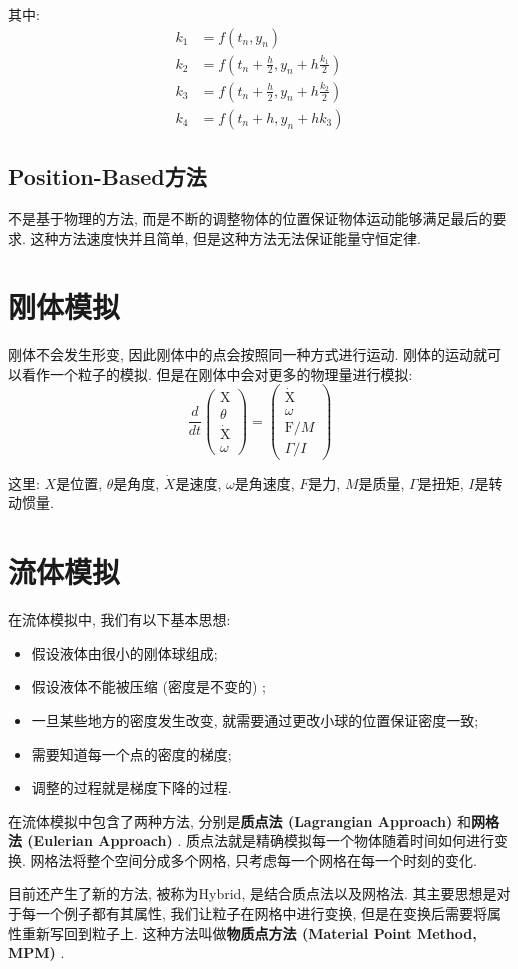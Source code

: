 \documentclass[openany]{progbookcn}
\begin{document}
其中: 
\begin{equation}
	\begin{split}
		k_{1} &=f\left(t_{n}, y_{n}\right) \\
		k_{2} &=f\left(t_{n}+\frac{h}{2}, y_{n}+h \frac{k_{1}}{2}\right) \\
		k_{3} &=f\left(t_{n}+\frac{h}{2}, y_{n}+h \frac{k_{2}}{2}\right) \\
		k_{4} &=f\left(t_{n}+h, y_{n}+h k_{3}\right)
	\end{split}
\end{equation}

\subsection{Position-Based方法}

不是基于物理的方法, 而是不断的调整物体的位置保证物体运动能够满足最后的要求. 这种方法速度快并且简单, 但是这种方法无法保证能量守恒定律. 

\section{刚体模拟}

刚体不会发生形变, 因此刚体中的点会按照同一种方式进行运动. 刚体的运动就可以看作一个粒子的模拟. 但是在刚体中会对更多的物理量进行模拟: 
\begin{equation}
	\frac{d}{d t}\left(\begin{array}{c}
		\mathrm{X} \\
		\theta \\
		\dot{\mathrm{X}} \\
		\omega
	\end{array}\right)=\left(\begin{array}{c}
		\dot{\mathrm{X}} \\
		\omega \\
		\mathrm{F} / M \\
		\Gamma / I
	\end{array}\right)
\end{equation}

这里: $X$是位置, $\theta$是角度, $\dot{X}$是速度, $\omega$是角速度, $F$是力, $M$是质量, $\Gamma$是扭矩, $I$是转动惯量. 

\section{流体模拟}

在流体模拟中, 我们有以下基本思想: 
\begin{itemize}
	\item 假设液体由很小的刚体球组成; 
	\item 假设液体不能被压缩 (密度是不变的) ; 
	\item 一旦某些地方的密度发生改变, 就需要通过更改小球的位置保证密度一致; 
	\item 需要知道每一个点的密度的梯度; 
	\item 调整的过程就是梯度下降的过程. 
\end{itemize}

在流体模拟中包含了两种方法, 分别是\textbf{质点法 (Lagrangian Approach) }和\textbf{网格法 (Eulerian Approach) }. 质点法就是精确模拟每一个物体随着时间如何进行变换. 网格法将整个空间分成多个网格, 只考虑每一个网格在每一个时刻的变化. 

目前还产生了新的方法, 被称为Hybrid, 是结合质点法以及网格法. 其主要思想是对于每一个例子都有其属性, 我们让粒子在网格中进行变换, 但是在变换后需要将属性重新写回到粒子上. 这种方法叫做\textbf{物质点方法 (Material Point Method,  MPM) }. 
\end{document}
